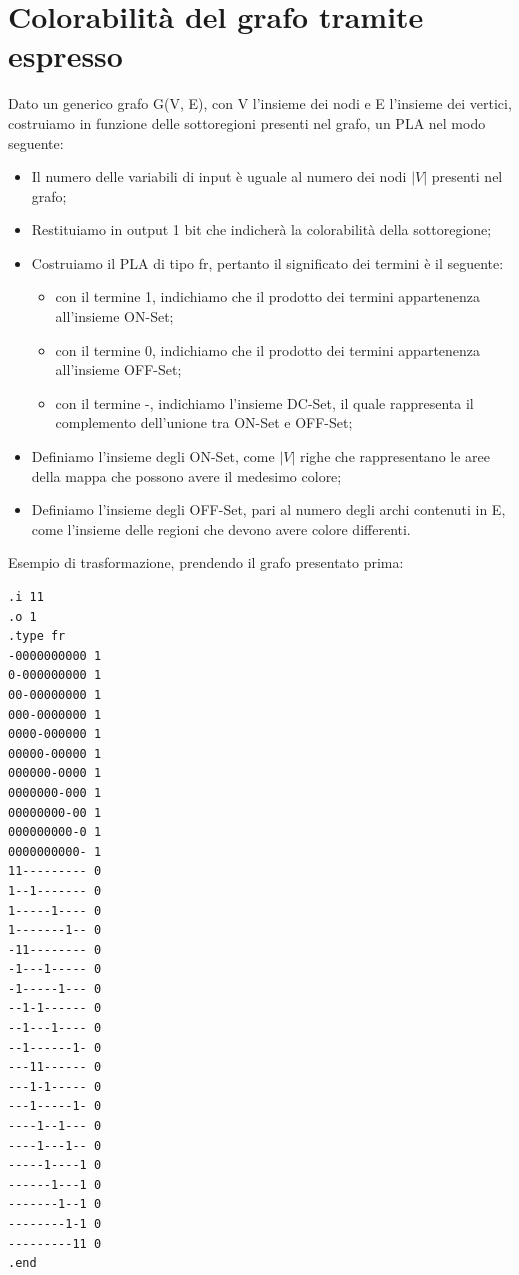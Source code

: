 \documentclass[a4paper,11pt]{article} %
\begin{document}
\section{Colorabilità del grafo tramite espresso}

Dato un generico grafo G(V, E), con V l’insieme dei nodi e E l’insieme dei vertici, costruiamo in funzione delle
sottoregioni presenti nel grafo, un PLA nel modo seguente:
\begin{itemize}
	\item Il numero delle variabili di input è uguale al numero dei nodi $|V|$ presenti nel grafo;
	\item Restituiamo in output 1 bit che indicherà la colorabilità della sottoregione;
	\item Costruiamo il PLA di tipo fr, pertanto il significato dei termini è il seguente:
	\begin{itemize}
		\item con il termine 1, indichiamo che il prodotto dei termini appartenenza all’insieme ON-Set;
		\item con il termine 0, indichiamo che il prodotto dei termini appartenenza all’insieme OFF-Set;
		\item con il termine -, indichiamo l’insieme DC-Set, il quale rappresenta il complemento dell’unione tra ON-Set e OFF-Set;
	\end{itemize}
	\item Definiamo l’insieme degli ON-Set, come $|V|$ righe che rappresentano le aree della mappa che possono avere il medesimo colore;
	\item Definiamo l’insieme degli OFF-Set, pari al numero degli archi contenuti in E, come l’insieme delle regioni
	che devono avere colore differenti.
\end{itemize}
Esempio di trasformazione, prendendo il grafo presentato prima:
\begin{verbatim}
.i 11
.o 1
.type fr
-0000000000 1
0-000000000 1
00-00000000 1
000-0000000 1
0000-000000 1
00000-00000 1
000000-0000 1
0000000-000 1
00000000-00 1
000000000-0 1
0000000000- 1
11--------- 0
1--1------- 0
1-----1---- 0
1-------1-- 0
-11-------- 0
-1---1----- 0
-1-----1--- 0
--1-1------ 0
--1---1---- 0
--1------1- 0
---11------ 0
---1-1----- 0
---1-----1- 0
----1--1--- 0
----1---1-- 0
-----1----1 0
------1---1 0
-------1--1 0
--------1-1 0
---------11 0
.end
\end{verbatim}
\end{document}

